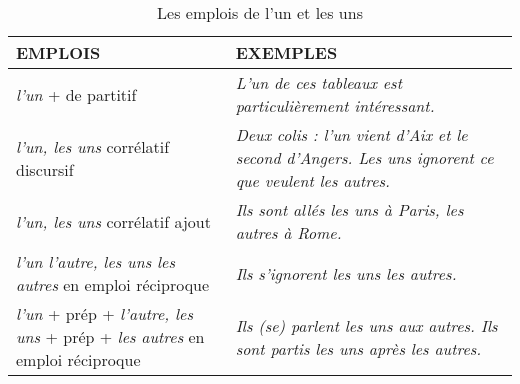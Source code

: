 \documentclass[UTF8]{report}
\begin{document}
\begin{table}[H]
\centering
\begin{tabular}{|>{\RaggedRight\arraybackslash}p{6cm}|>{\RaggedRight\arraybackslash}p{8cm}|} %
\hline
\rowcolor{cyan!20}
\textbf{EMPLOIS} & \textbf{EXEMPLES} \\
\hline
\textit{l'un} + de partitif & \textit{L'un de ces tableaux est particulièrement intéressant.} \\
\hline
\textit{l'un, les uns} corrélatif discursif & \textit{Deux colis : l'un vient d'Aix et le second d'Angers. Les uns ignorent ce que veulent les autres.} \\
\hline
\textit{l'un, les uns} corrélatif ajout & \textit{Ils sont allés les uns à Paris, les autres à Rome.} \\
\hline
\textit{l'un l'autre, les uns les autres} en emploi réciproque & \textit{Ils s'ignorent les uns les autres.} \\
\hline
\textit{l'un} + prép + \textit{l'autre, les uns} + prép + \textit{les autres} en emploi réciproque & \textit{Ils (se) parlent les uns aux autres. Ils sont partis les uns après les autres.} \\
\hline
\end{tabular}
\caption{Les emplois de l’un et les uns}
\end{table}
\end{document}

